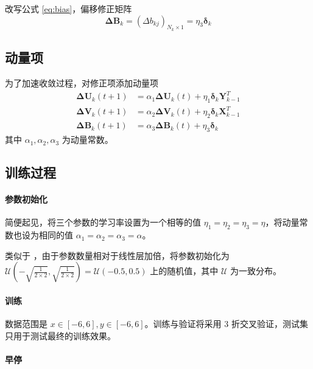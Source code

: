     改写公式 \eqref{eq:bias}，偏移修正矩阵
    \begin{equation*}
        \mathbf{\Delta B}_{k} = (\Delta b_{kj})_{N_{k}\times 1} = \eta_3 \boldsymbol{\delta}_{k}
    \end{equation*}

    \subsection{动量项}

    为了加速收敛过程，对修正项添加动量项
    \begin{align}
        \mathbf{\Delta U}_{k}(t+1) &= \alpha_1\mathbf{\Delta U}_{k}(t) + \eta_1 \boldsymbol{\delta}_k\mathbf{Y}_{k-1}^T \\
        \mathbf{\Delta V}_{k}(t+1) &= \alpha_2\mathbf{\Delta V}_{k}(t) + \eta_2 \boldsymbol{\delta}_k\mathbf{X}_{k-1}^T \\
        \mathbf{\Delta B}_{k}(t+1) &= \alpha_3\mathbf{\Delta B}_{k}(t) + \eta_3 \boldsymbol{\delta}_{k}
    \end{align}
    其中 $\alpha_1,\alpha_2,\alpha_3$ 为动量常数。

    \subsection{训练过程}

    \paragraph{参数初始化}

    简便起见，将三个参数的学习率设置为一个相等的值 $\eta_1=\eta_2=\eta_3=\eta$，将动量常数也设为相同的值 $\alpha_1=\alpha_2=\alpha_3=\alpha$。

    类似于 \cite{torchlinear}，由于参数数量相对于线性层加倍，将参数初始化为 $\mathcal{U}\left(-\sqrt{\frac{1}{2\times 2}},\sqrt{\frac{1}{2\times 2}}\right)=\mathcal{U}(-0.5,0.5)$ 上的随机值，其中 $\mathcal{U}$ 为一致分布。

    \paragraph{训练}

    数据范围是 $x\in[-6,6],y\in[-6,6]$。训练与验证将采用 3 折交叉验证，测试集只用于测试最终的训练效果。

    \paragraph{早停}

